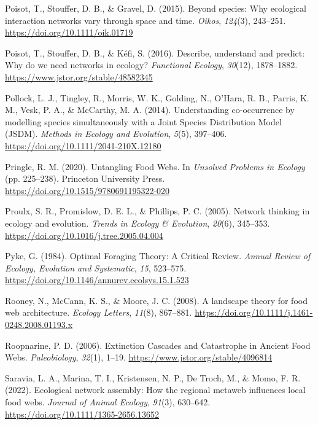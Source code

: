 \documentclass[
]{article}
\newlength{\cslhangindent}
\newenvironment{CSLReferences}[2] %
 {\begin{list}{}{%
  \setlength{\itemindent}{0pt}
  \setlength{\leftmargin}{0pt}
  \setlength{\parsep}{0pt}
  \ifodd #1
   \setlength{\leftmargin}{\cslhangindent}
   \setlength{\itemindent}{-1\cslhangindent}
  \fi
  \setlength{\itemsep}{#2\baselineskip}}}
 {\end{list}}
\begin{document}
\begin{CSLReferences}{1}{0}
Poisot, T., Stouffer, D. B., \& Gravel, D. (2015). Beyond species: Why
ecological interaction networks vary through space and time.
\emph{Oikos}, \emph{124}(3), 243--251.
\url{https://doi.org/10.1111/oik.01719}

Poisot, T., Stouffer, D. B., \& Kéfi, S. (2016). Describe, understand
and predict: Why do we need networks in ecology? \emph{Functional
Ecology}, \emph{30}(12), 1878--1882.
\url{https://www.jstor.org/stable/48582345}

Pollock, L. J., Tingley, R., Morris, W. K., Golding, N., O'Hara, R. B.,
Parris, K. M., Vesk, P. A., \& McCarthy, M. A. (2014). Understanding
co-occurrence by modelling species simultaneously with a {Joint Species
Distribution Model} ({JSDM}). \emph{Methods in Ecology and Evolution},
\emph{5}(5), 397--406. \url{https://doi.org/10.1111/2041-210X.12180}

Pringle, R. M. (2020). Untangling {Food Webs}. In \emph{Unsolved
{Problems} in {Ecology}} (pp. 225--238). Princeton University Press.
\url{https://doi.org/10.1515/9780691195322-020}

Proulx, S. R., Promislow, D. E. L., \& Phillips, P. C. (2005). Network
thinking in ecology and evolution. \emph{Trends in Ecology \&
Evolution}, \emph{20}(6), 345--353.
\url{https://doi.org/10.1016/j.tree.2005.04.004}

Pyke, G. (1984). Optimal {Foraging Theory}: {A Critical Review}.
\emph{Annual Review of Ecology, Evolution and Systematic}, \emph{15},
523--575. \url{https://doi.org/10.1146/annurev.ecolsys.15.1.523}

Rooney, N., McCann, K. S., \& Moore, J. C. (2008). A landscape theory
for food web architecture. \emph{Ecology Letters}, \emph{11}(8),
867--881. \url{https://doi.org/10.1111/j.1461-0248.2008.01193.x}

Roopnarine, P. D. (2006). Extinction {Cascades} and {Catastrophe} in
{Ancient Food Webs}. \emph{Paleobiology}, \emph{32}(1), 1--19.
\url{https://www.jstor.org/stable/4096814}

Saravia, L. A., Marina, T. I., Kristensen, N. P., De Troch, M., \& Momo,
F. R. (2022). Ecological network assembly: {How} the regional metaweb
influences local food webs. \emph{Journal of Animal Ecology},
\emph{91}(3), 630--642. \url{https://doi.org/10.1111/1365-2656.13652}


\end{CSLReferences}
\end{document}
